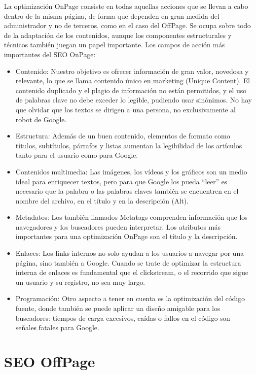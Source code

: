 La optimización OnPage consiste en todas aquellas acciones que se llevan a cabo dentro de la misma página, de forma que dependen en gran medida del administrador y no de terceros, como en el caso del OffPage. Se ocupa sobre todo de la adaptación de los contenidos, aunque los componentes estructurales y técnicos también juegan un papel importante. Los campos de acción más importantes del SEO OnPage:
\begin{itemize}
    \item Contenido: Nuestro objetivo es ofrecer información de gran valor, novedosa y relevante, lo que se llama contenido único en marketing (Unique Content). El contenido duplicado y el plagio de información no están permitidos, y el uso de palabras clave no debe exceder lo legible, pudiendo usar sinónimos. No hay que olvidar que los textos se dirigen a una persona, no exclusivamente al robot de Google.
    \item Estructura: Además de un buen contenido, elementos de formato como títulos, subtítulos, párrafos y listas aumentan la legibilidad de los artículos tanto para el usuario como para Google.
    \item Contenidos multimedia: Las imágenes, los vídeos y los gráficos son un medio ideal para enriquecer textos, pero para que Google los pueda “leer” es necesario que la palabra o las palabras claves también se encuentren en el nombre del archivo, en el título y en la descripción (Alt).
    \item Metadatos: Los también llamados Metatags comprenden información que los navegadores y los buscadores pueden interpretar. Los atributos más importantes para una optimización OnPage son el título y la descripción.
    \item Enlaces: Los links internos no solo ayudan a los usuarios a navegar por una página, sino también a Google. Cuando se trate de optimizar la estructura interna de enlaces es fundamental que el clickstream, o el recorrido que sigue un usuario y su registro, no sea muy largo.
    \item Programación: Otro aspecto a tener en cuenta es la optimización del código fuente, donde también se puede aplicar un diseño amigable para los buscadores: tiempos de carga excesivos, caídas o fallos en el código son señales fatales para Google.
\end{itemize}

\section{SEO OffPage}

